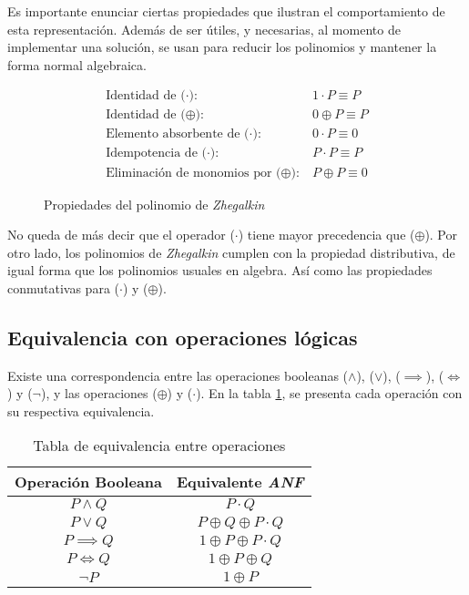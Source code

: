Es importante enunciar ciertas propiedades que ilustran el comportamiento de esta representación\cite{zhegalkin}. Además de ser útiles, y necesarias, al momento de implementar una solución, se usan para reducir los polinomios y mantener la forma normal algebraica.

\begin{figure}
\begin{align*}
    \text{Identidad de ($\cdot$):}\ & 1 \cdot P \equiv P\\
    \text{Identidad de ($\oplus$):}\ & 0 \oplus P \equiv P\\
    \text{Elemento absorbente de ($\cdot$):}\ & 0 \cdot P \equiv 0\\
    \text{Idempotencia de ($\cdot$):}\ & P \cdot P \equiv P\\
    \text{Eliminación de monomios por ($\oplus$):}\ & P \oplus P \equiv 0
\end{align*}
\caption{Propiedades del polinomio de \textit{Zhegalkin}}
\label{fig:properties}
\end{figure}

No queda de más decir que el operador ($\cdot$) tiene mayor precedencia que ($\oplus$). Por otro lado, los polinomios de \textit{Zhegalkin} cumplen con la propiedad distributiva, de igual forma que los polinomios usuales en algebra. Así como las propiedades conmutativas para ($\cdot$) y ($\oplus$).

\subsection{Equivalencia con operaciones lógicas}

Existe una correspondencia entre las operaciones booleanas ($\land$), ($\lor$), ($\implies$), ($\iff$) y ($\neg$), y las operaciones ($\oplus$) y ($\cdot$). En la tabla \ref{table:1}, se presenta cada operación con su respectiva equivalencia.

\begin{table}
\centering
\begin{tabular}{|| c | c ||}
 \hline
 Operación Booleana & Equivalente \textit{ANF} \\ [0.1ex]
 \hline\hline
 $P \land Q$ & $P\cdot Q$  \\
 $P \lor Q$ & $P\oplus Q\oplus P\cdot Q$  \\
 $P \implies Q$ & $1\oplus P\oplus P\cdot Q$  \\
 $P \iff Q$ & $1\oplus P\oplus Q$  \\
 $\neg P$ & $1\oplus P$  \\
 \hline
\end{tabular}
\caption{Tabla de equivalencia entre operaciones}
\label{table:1}
\end{table}

